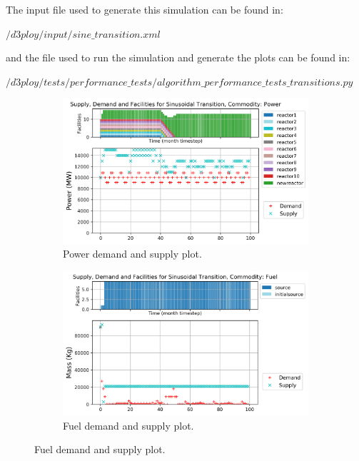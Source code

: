 \documentclass[11pt,letterpaper]{article}
\begin{document}
The input file used to generate this simulation can be found in:

\noindent
$/d3ploy/input/sine\_transition.xml$

\noindent
and the file used to run the simulation and generate the plots can be found in:

\noindent
$/d3ploy/tests/performance\_tests/algorithm\_performance\_tests\_transitions.py$

\begin{figure}[!htbp]
    \centering
    \begin{subfigure}[t]{\textwidth}
    \centering
        \includegraphics[width=\linewidth]{figures/sinetransition-power.png} 
        \caption{Power demand and supply plot.}
        \label{fig:sinetransition-power}
    \end{subfigure}
    \vspace{1cm}
    \begin{subfigure}[t]{0.45\textwidth}
        \centering
        \includegraphics[width=\linewidth]{figures/sinetransition-fuel.png} 
        \caption{Fuel demand and supply plot.}

\end{subfigure}
\end{figure}
\end{document}
